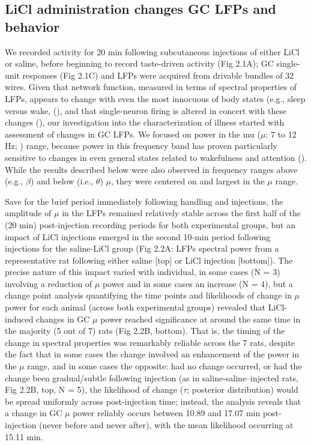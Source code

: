 \begin{refsection}
\subsection{LiCl administration changes GC LFPs and behavior}
We recorded activity for 20 min following subcutaneous injections of either LiCl or saline, before beginning to record taste-driven activity (Fig 2.1A); GC single-unit responses (Fig 2.1C) and LFPs were acquired from drivable bundles of 32 wires. Given that network function, measured in terms of spectral properties of LFPs, appears to change with even the most innocuous of body states (e.g., sleep versus wake, (\cite{mukamel2014a,ab2015a}), and that single-neuron firing is altered in concert with these changes (\cite{manning2009a,fontanini2008a}), our investigation into the characterization of illness started with assessment of changes in GC LFPs. We focused on power in the mu (\(\mu\): 7 to 12 Hz; \cite{fontanini2005a}) range, because power in this frequency band has proven particularly sensitive to changes in even general states related to wakefulness and attention (\cite{ching2014a,fontanini2005a,fontanini2006a,tort2010a,vijayan2013a}). While the results described below were also observed in frequency ranges above (e.g., \(\beta\)) and below (i.e., \(\theta\)) \(\mu\), they were centered on and largest in the \(\mu\) range.

Save for the brief period immediately following handling and injections, the amplitude of \(\mu\) in the LFPs remained relatively stable across the first half of the (20 min) post-injection recording periods for both experimental groups, but an impact of LiCl injections emerged in the second 10-min period following injections for the saline-LiCl group (Fig 2.2A: LFPs spectral power from a representative rat following either saline [top] or LiCl injection [bottom]). The precise nature of this impact varied with individual, in some cases (N = 3) involving a reduction of \(\mu\) power and in some cases an increase (N = 4), but a change point analysis quantifying the time points and likelihoods of change in \(\mu\) power for each animal (across both experimental groups) revealed that LiCl-induced changes in GC \(\mu\) power reached significance at around the same time in the majority (5 out of 7) rats (Fig 2.2B, bottom). That is, the timing of the change in spectral properties was remarkably reliable across the 7 rats, despite the fact that in some cases the change involved an enhancement of the power in the \(\mu\) range, and in some cases the opposite: had no change occurred, or had the change been gradual/subtle following injection (as in saline-saline–injected rats, Fig 2.2B, top, N = 5), the likelihood of change (\(\tau\); posterior distribution) would be spread uniformly across post-injection time; instead, the analysis reveals that a change in GC \(\mu\) power reliably occurs between 10.89 and 17.07 min post-injection (never before and never after), with the mean likelihood occurring at 15.11 min.


\end{refsection}
